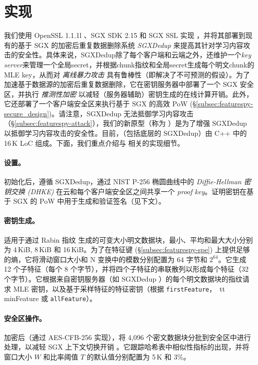 \section{实现}
\label{sec:featurespy-implementation}
我们使用 OpenSSL 1.1.1l \cite{openssl}、SGX SDK 2.15 \cite{sgxsdk} 和 SGX SSL \cite{sgxssl} 实现 \sysnameF，并将其部署到现有的基于 SGX 的加密后重复数据删除系统 {\em SGXDedup} \cite{ren21} 来提高其针对学习内容攻击的安全性。具体来说，SGXDedup除了每个客户端和云端之外，还维护一个{\em key server}来管理一个全局secret，并根据chunk指纹和全局secret生成每个明文chunk的MLE key，从而对 {\em 离线暴力攻击} 具有鲁棒性（即解决了不可预测的假设）\cite{bellare2013DupLESS}。为了加速基于数据源的加密后重复数据删除，它在密钥服务器中部署了一个 SGX 安全区，并执行 {\em 推测性加密} \cite{eduardo19} 以减轻（服务器辅助）密钥生成的在线计算开销。此外，它还部署了一个客户端安全区来执行基于 SGX 的高效 PoW (\S\ref{subsec:featurespy-secure_design})。请注意，SGXDedup 无法抵御学习内容攻击（\S\ref{subsec:featurespy-attack}），我们的新原型（称为 \prototype）是为了增强 SGXDedup 以抵御学习内容攻击的安全性。目前，\prototype（包括底层的 SGXDedup）由 C++ 中的 16\,K LoC 组成。下面，我们重点介绍与 \prototype 相关的实现细节。


\paragraph*{设置。}
初始化后，\prototype 遵循 SGXDedup，通过 NIST P-256 椭圆曲线中的 {\em Diffie-Hellman 密钥交换 (DHKE)} 在云和每个客户端安全区之间共享一个 {\em proof key}。证明密钥在基于 SGX 的 PoW 中用于生成和验证签名（见下文）。


\paragraph*{密钥生成。}
\prototype 适用于通过 Rabin 指纹 \cite{rabin81} 生成的可变大小明文数据块，最小、平均和最大大小分别为 4\,KiB, 8\,KiB 和 16\,KiB。为了在特征键 (\S\ref{subsec:featurespy-spe}) 上提供足够的熵，它将滑动窗口大小和 N 变换中的模数分别配置为 64 字节和 $2^{64}$。它生成 12 个子特征（每个 8 个字节），并将四个子特征的串联散列以形成每个特征（32 个字节）。它根据来自密钥服务器（如 SGXDedup \cite{ren21}）的每个明文数据块的指纹请求 MLE 密钥，以及基于采样特征的特征密钥（根据 {\tt firstFeature}，{\ tt minFeature} 或 {\tt allFeature}）。


\paragraph*{安全区操作。}
加密后（通过 AES-CFB-256 实现），\prototype 将 4,096 个密文数据块分批到安全区中进行处理，以减轻 SGX 上下文切换开销 \cite{arnautov2016SCONE}。它跟踪哈希表中相似性指标的出现，并将窗口大小 $W$ 和比率阈值 $T$ 的默认值分别配置为 5\,K 和 3\%。

